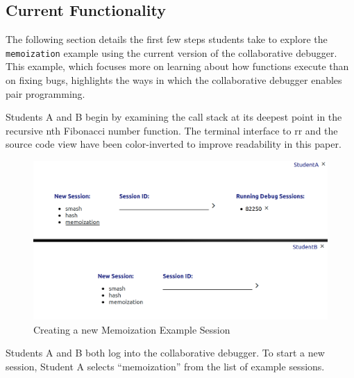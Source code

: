 \documentclass[12pt]{article}
\begin{document}
\subsection{Current Functionality} \label{current}

The following section details the first few steps students take to
explore the \lstinline{memoization} example using the current version
of the collaborative debugger.  This example, which focuses more on
learning about how functions execute than on fixing bugs, highlights
the ways in which the collaborative debugger enables pair programming.
\par

Students A and B begin by examining the call stack at its deepest
point in the recursive nth Fibonacci number function.  The terminal
interface to rr and the source code view have been color-inverted to
improve readability in this paper.

\begin{figure}[h!]

  \includegraphics[width=\textwidth]{session1i}
  \centering
  \caption{Creating a new Memoization Example Session}
  \label{session1i}
\end{figure}

Students A and B both log into the collaborative debugger.  To start a
new session, Student A selects ``memoization'' from the list of
example sessions.\pagebreak
\end{document}
